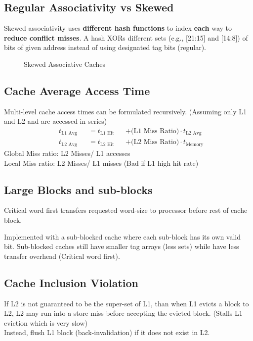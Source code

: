 \documentclass{article}
\begin{document}
\begin{multicols*}{2}
\subsection*{Regular Associativity vs Skewed}
Skewed associativity uses \textbf{different hash functions} to index \textbf{each} way to \textbf{reduce conflict misses}. A hash XORs different sets (e.g., [21:15] and [14:8]) of bits of given address instead of using designated tag bits (regular).

\begin{figure}[H]
\end{figure}

\begin{figure}[H]
  \caption{Skewed Associative Caches}
\end{figure}

\subsection*{Cache Average Access Time}
Multi-level cache access times can be formulated recursively. (Assuming only L1 and L2 and are accessed in series)
\begin{alignat*}{3}
    &t_{\text{L1 Avg}} &&= t_{\text{L1 Hit}} &&+ \text{(L1 Miss Ratio)} \cdot t_{\text{L2 Avg}} \\
    &t_{\text{L2 Avg}} &&= t_{\text{L2 Hit}} &&+ \text{(L2 Miss Ratio)} \cdot t_{\text{Memory}}
\end{alignat*}
Global Miss ratio: L2 Misses/ L1 accesses \\
Local Miss ratio: L2 Misses/ L1 misses (Bad if L1 high hit rate)

\subsection*{Large Blocks and sub-blocks}
Critical word first transfers requested word-size to processor before rest of cache block.
\medskip\par\noindent
Implemented with a sub-blocked cache where each sub-block has its own valid bit. Sub-blocked caches still have smaller tag arrays (less sets) while have less transfer overhead (Critical word first).

\subsection*{Cache Inclusion Violation}
If L2 is not guaranteed to be the super-set of L1, than when L1 evicts a block to L2, L2 may run into a store miss before accepting the evicted block. (Stalls L1 eviction which is very slow)\\
Instead, flush L1 block (back-invalidation) if it does not exist in L2.


\end{multicols*}
\end{document}

